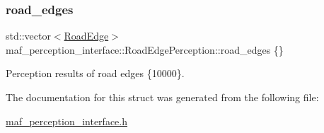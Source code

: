 \subsubsection{\texorpdfstring{road\+\_\+edges}{road\_edges}}
{\footnotesize\ttfamily std\+::vector$<$\hyperlink{structmaf__perception__interface_1_1RoadEdge}{Road\+Edge}$>$ maf\+\_\+perception\+\_\+interface\+::\+Road\+Edge\+Perception\+::road\+\_\+edges \{\}}



Perception results of road edges \{10000\}. 



The documentation for this struct was generated from the following file\+:\begin{DoxyCompactItemize}
\item 
\hyperlink{maf__perception__interface_8h}{maf\+\_\+perception\+\_\+interface.\+h}\end{DoxyCompactItemize}
